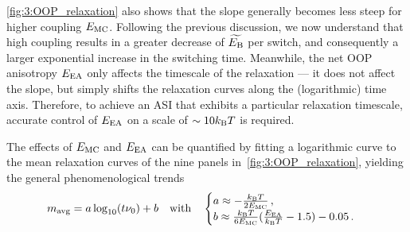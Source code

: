 \cref{fig:3:OOP_relaxation} also shows that the slope generally becomes less steep for higher coupling $E_\mathrm{MC}$.
Following the previous discussion, we now understand that high coupling results in a greater decrease of $\widetilde{E_\mathrm{B}}$ per switch, and consequently a larger exponential increase in the switching time.
Meanwhile, the net OOP anisotropy $E_\mathrm{EA}$ only affects the timescale of the relaxation --- it does not affect the slope, but simply shifts the relaxation curves along the (logarithmic) time axis.
Therefore, to achieve an ASI that exhibits a particular relaxation timescale, accurate control of $E_\mathrm{EA}$ on a scale of $\sim 10\kBT$ is required. \par
The effects of $E_\mathrm{MC}$ and $E_\mathrm{EA}$ can be quantified by fitting a logarithmic curve to the mean relaxation curves of the nine panels in~\cref{fig:3:OOP_relaxation}, yielding the general phenomenological trends
\begin{equation}
	\label{eq:3:relaxation_fit_ab}
	\mavg = a \log_{10}(t \nu_0) + b \quad \mathrm{with} \quad \begin{cases}
		a \approx -\frac{\kBT}{2\EMC} \, \mathrm{,} \\
		b \approx \frac{\kBT}{6\EMC}(\frac{\EEA}{\kBT} - 1.5) - 0.05 \, \mathrm{.}
	\end{cases}
\end{equation}


